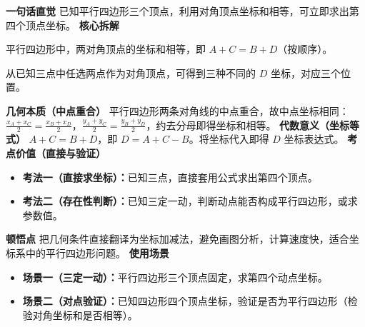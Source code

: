 \begin{explanationbox}
	\textbf{\textcolor{CExplanation}{一句话直觉}}
	已知平行四边形三个顶点，利用对角顶点坐标和相等，可立即求出第四个顶点坐标。
	\medskip
	\textbf{\textcolor{CExplanation}{核心拆解}}
	\begin{description}[style=nextline, leftmargin=2.8em, labelsep=0.5em, itemsep=0.45em]
		\item[\textbf{要点一（对角和相等）：}]平行四边形中，两对角顶点的坐标和相等，即 $A+C = B+D$（按顺序）。
		\item[\textbf{要点二（三种配对）：}]从已知三点中任选两点作为对角顶点，可得到三种不同的 $D$ 坐标，对应三个位置。
	\end{description}
	\medskip
	\textbf{\textcolor{CExplanation}{几何本质（中点重合）}}
	平行四边形两条对角线的中点重合，故中点坐标相同：$\frac{x_A+x_C}{2}=\frac{x_B+x_D}{2}$，$\frac{y_A+y_C}{2}=\frac{y_B+y_D}{2}$，约去分母即得坐标和相等。
	\medskip
	\textbf{\textcolor{CExplanation}{代数意义（坐标等式）}}
	$A+C=B+D$，即 $D=A+C-B$。将坐标代入即得 $D$ 坐标表达式。
	\medskip
	\textbf{\textcolor{CExplanation}{考点价值（直接与验证）}}
	\begin{itemize}[leftmargin=*, itemsep=0.5em, topsep=0.4em]
		\item \textbf{考法一（直接求坐标）：}已知三点，直接套用公式求出第四个顶点。
		\item \textbf{考法二（存在性判断）：}已知三定一动，判断动点能否构成平行四边形，或求参数值。
	\end{itemize}
	\medskip
	\textbf{\textcolor{CExplanation}{顿悟点}}
	把几何条件直接翻译为坐标加减法，避免画图分析，计算速度快，适合坐标系中的平行四边形问题。
	\medskip
	\textbf{\textcolor{CExplanation}{使用场景}}
	\begin{itemize}[leftmargin=*, itemsep=0.5em, topsep=0.4em]
		\item \textbf{场景一（三定一动）：}平行四边形三个顶点固定，求第四个动点坐标。
		\item \textbf{场景二（对点验证）：}已知四边形四个顶点坐标，验证是否为平行四边形（检验对角坐标和是否相等）。
	\end{itemize}
\end{explanationbox}
